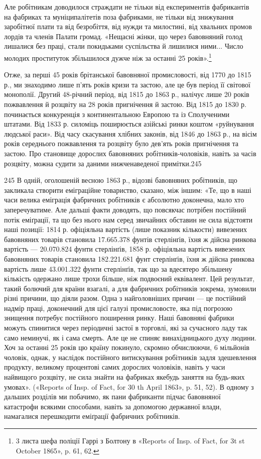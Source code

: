 Але робітникам доводилося страждати не тільки від експериментів
фабрикантів на фабриках та муніципалітетів поза фабриками,
не тільки від знижування заробітної плати та від безробіття, від
нужди та милостині, від хвальних промов лордів та членів Палати
громад. «Нещасні жінки, що через бавовняний голод лишалися
без праці, стали покидьками суспільства й лишилися ними...
Число молодих проституток збільшилося дужче ніж за останні
25 років».\footnote{
3 листа шефа поліції Гаррі з Болтону в «Reports of Insp. of Fact,
for 3t st October 1865», p. 61, 62.
}

Отже, за перші 45 років брітанської бавовняної промисловості,
від 1770 до 1815 р., ми знаходимо лише п’ять років кризи та застою,
але це був період її світової монополії. Другий 48-річний період,
від 1815 до 1863 р., налічує лише 20 років пожвавлення
й розцвіту на 28 років пригнічення й застою. Від 1815 до 1830 р.
починається конкуренція з континентальною Европою та із
Сполученими штатами. Від 1833 р. силоміць поширюється азійські
ринки коштом «руйнування людської раси». Від часу скасування
хлібних законів, від 1846 до 1863 р., на вісім років середнього
пожвавлення та розцвіту було дев’ять років пригнічення
та застою. Про становище дорослих бавовняних робітників-чоловіків,
навіть за часів розцвіту, можна судити за даними нижченаведеної
примітки.245

245 В одній, оголошеній весною 1863 р., відозві бавовняних робітників,
що закликала створити еміграційне товариство, сказано, між іншим:
«Те, що в наші часи велика еміграція фабричних робітників є абсолютно
доконечна, мало хто заперечуватиме. Але дальші факти доводять, що
повсякчас потрібен постійний потік еміґрації, та що без нього нам серед
звичайних обставин не сила відстояти наші позиції: 1814 р. офіціяльна
вартість (лише показник кількости) вивезених бавовняних товарів становила
17.665.378 фунтів стерлінґів, їхня ж дійсна ринкова вартість —
20.070.824 фунти стерлінґів, 1858 р. офіціяльна вартість вивезених бавовняних
товарів становила 182.221.681 фунт стерлінґів, їхня ж дійсна
ринкова вартість лише 43.001.322 фунти стерлінґів, так що за вдесятеро
збільшену кількість одержано лише трохи більше, ніж подвоєний еквівалент.
Цей результат, такий болючий для країни взагалі, а для фабричних
робітників зокрема, зумовили різні причини, що діяли разом. Одна
з найголовніших причин — це постійний надмір праці, доконечний для
цієї галузі промисловосте, яка під погрозою знищення потребує постійного
поширення ринку. Наші бавовняні фабрики можуть спинитися через
періодичні застої в торговлі, які за сучасного ладу так само неминучі,
як і сама смерть. Але це не спиняє винахідницького духу людини. Хоч
за останні 25 років цю країну покинуло, скромно обчислюючи, 6 мільйонів
чоловік, однак, у наслідок постійного витискування робітників задля
здешевлення продукту, великому процентові самих дорослих чоловіків,
навіть у часи найвищого розцвіту, не сила знайти на фабриках якебудь
заняття на будь-яких умовах». («Reports of Insp. of Fact, for 30 th April
1863», p. 51, 52). В одному з дальших розділів ми побачимо, як пани
фабриканти підчас бавовняної катастрофи всякими способами, навіть за
допомогою державної влади, намагалися перешкодити еміґрації фабричних
робітників.
